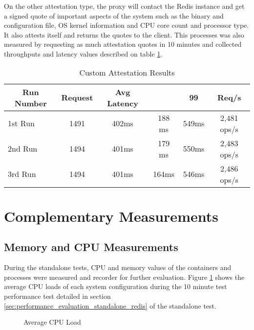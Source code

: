 On the other attestation type, the proxy will contact the Redis instance and get a signed quote of important aspects of the system such as the binary and configuration file, \gls{OS} kernel information and \gls{CPU} core count and processor type. It also attests itself and returns the quotes to the client. This processes was also measured by requesting as much attestation quotes in 10 minutes and collected throughputs and latency values described on table \ref{tab:custom_attestation_results}.

\begin{table}[ht]
	\caption{Custom Attestation Results}
	\label{tab:custom_attestation_results}
\centering
\begin{tabular}{lccccc}
	\toprule
	\multicolumn{1}{c}{\textbf{Run Number}} & \pmb{\#}\textbf{Request} & \textbf{Avg Latency} & \pmb{\ensuremath{\sigma}} & \textbf{99}\pmb{\%} & \textbf{Req/s} \\
	\midrule
		1st Run & 1491 & 402ms & 188	ms & 549ms & 2,481 ops/s \\
		2nd Run & 1494 & 401ms & 179	ms & 550ms & 2,483 ops/s \\
		3rd Run & 1494 & 401ms & 164ms & 546ms & 2,486 ops/s \\
	\bottomrule
\end{tabular}
\end{table}

\section{Complementary Measurements}
\label{sec:complementary_measurements}

\subsection{Memory and CPU Measurements}
\label{ssec:memory_and_cpu_measurements}

During the standalone tests, \gls{CPU} and memory values of the containers and processes were measured and recorder for further evaluation. Figure \ref{fig:average_cpu_load} shows the average \gls{CPU} loads of each system configuration during the 10 minute test performance test detailed in section \ref{sec:performance_evaluation_standalone_redis} of the standalone test.

\begin{figure}[htbp]
  \caption{Average CPU Load}
  \label{fig:average_cpu_load}
\end{figure}


